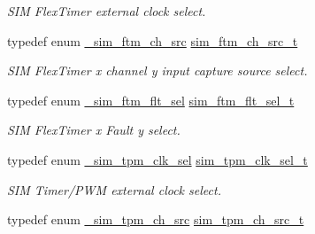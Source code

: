 \begin{DoxyCompactItemize}
\begin{DoxyCompactList}\small\item\em S\+IM Flex\+Timer external clock select. \end{DoxyCompactList}\item 
typedef enum \hyperlink{group__sim__hal_ga1fbcdea9dba7be70b6f169af27855bba}{\+\_\+sim\+\_\+ftm\+\_\+ch\+\_\+src} \hyperlink{group__sim__hal_ga1b870891313d5b9c55d2d32be3453231}{sim\+\_\+ftm\+\_\+ch\+\_\+src\+\_\+t}\hypertarget{group__sim__hal_ga1b870891313d5b9c55d2d32be3453231}{}\label{group__sim__hal_ga1b870891313d5b9c55d2d32be3453231}

\begin{DoxyCompactList}\small\item\em S\+IM Flex\+Timer x channel y input capture source select. \end{DoxyCompactList}\item 
typedef enum \hyperlink{group__sim__hal_gad0a1375efffd7a8c2b2cfba7abd9a43a}{\+\_\+sim\+\_\+ftm\+\_\+flt\+\_\+sel} \hyperlink{group__sim__hal_ga5f1270e40e152e6fa6f9b845fb8f5bc3}{sim\+\_\+ftm\+\_\+flt\+\_\+sel\+\_\+t}\hypertarget{group__sim__hal_ga5f1270e40e152e6fa6f9b845fb8f5bc3}{}\label{group__sim__hal_ga5f1270e40e152e6fa6f9b845fb8f5bc3}

\begin{DoxyCompactList}\small\item\em S\+IM Flex\+Timer x Fault y select. \end{DoxyCompactList}\item 
typedef enum \hyperlink{group__sim__hal_ga38d7486974495e036b31f1b2662225f7}{\+\_\+sim\+\_\+tpm\+\_\+clk\+\_\+sel} \hyperlink{group__sim__hal_gaaae3e3d207612ecbfc7d9fb15f393bd9}{sim\+\_\+tpm\+\_\+clk\+\_\+sel\+\_\+t}\hypertarget{group__sim__hal_gaaae3e3d207612ecbfc7d9fb15f393bd9}{}\label{group__sim__hal_gaaae3e3d207612ecbfc7d9fb15f393bd9}

\begin{DoxyCompactList}\small\item\em S\+IM Timer/\+P\+WM external clock select. \end{DoxyCompactList}\item 
typedef enum \hyperlink{group__sim__hal_ga7f8a5b4e3d3de690cd1881172e726fb5}{\+\_\+sim\+\_\+tpm\+\_\+ch\+\_\+src} \hyperlink{group__sim__hal_ga82807d4d46060b2abab884b3bd335b29}{sim\+\_\+tpm\+\_\+ch\+\_\+src\+\_\+t}\hypertarget{group__sim__hal_ga82807d4d46060b2abab884b3bd335b29}{}\label{group__sim__hal_ga82807d4d46060b2abab884b3bd335b29}


\end{DoxyCompactItemize}
